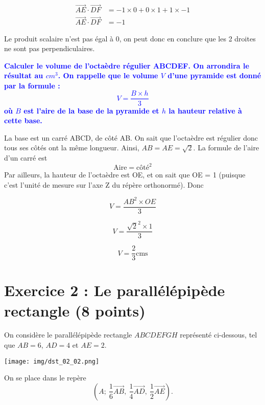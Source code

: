 \documentclass{exam}
\begin{document}
\begin{questions}
\begin{align*}
  \overrightarrow{AE} \cdot \overrightarrow{DF} &= -1 \times 0 + 0 \times 1 + 1 \times -1 \\
  \overrightarrow{AE} \cdot \overrightarrow{DF} &= -1
\end{align*}

Le produit scalaire n'est pas égal à 0, on peut donc en conclure que les 2 droites ne sont pas perpendiculaires.

  \question[1] \textbf{\textcolor{blue}{Calculer le volume de l'octaèdre régulier ABCDEF. On arrondira le résultat au $cm^3$. On rappelle que le volume $V$ d'une pyramide est donné par la formule :
 \[
  V = \frac{B \times h}{3}
  \]
  où $B$ est l'aire de la base de la pyramide et $h$ la hauteur relative à cette base.}}

  La base est un carré ABCD, de côté AB. On sait que l'octaèdre est régulier donc tous ses côtés ont la même longueur. Ainsi, $AB = AE = \sqrt{2}$. La formule de l'aire d'un carré est 
  \[\text{Aire} = \text{côté}^2\]
  Par ailleurs, la hauteur de l'octaèdre est OE, et on sait que OE = 1 (puisque c'est l'unité de mesure sur l'axe Z du répère orthonormé). Donc

  \[
    V = \frac{ AB^2 \times OE }{3}
    \]


  \[
    V = \frac{ \sqrt{2}^2 \times 1 }{3}
    \]

\[
    V = \frac{2}{3} \text{cms}
    \]

\end{questions} 



\section*{Exercice 2 : Le parallélépipède rectangle (8 points)}

On considère le parallélépipède rectangle $ABCDEFGH$ représenté ci-dessous, tel que $AB = 6$, $AD = 4$ et $AE = 2$.

\begin{center}
    \texttt{[image: img/dst\_02\_02.png]}
\end{center}

On se place dans le repère 
\[
\left(A \mathpunct{}; \ \frac{1}{6} \overrightarrow{AB}\mathpunct{}, \ \frac{1}{4} \overrightarrow{AD}\mathpunct{}, \ \frac{1}{2} \overrightarrow{AE}\right).
\]
\end{document}
